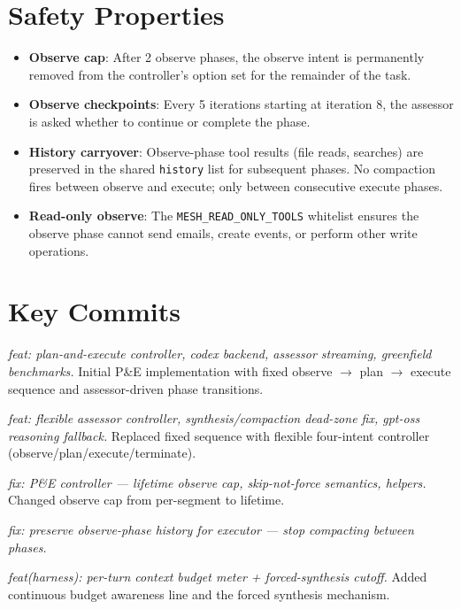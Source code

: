 \documentclass[11pt,letterpaper]{report}
\newcommand{\code}[1]{\texttt{#1}}
\begin{document}
\section{Safety Properties}

\begin{itemize}[nosep]
  \item \textbf{Observe cap}: After 2 observe phases, the observe
        intent is permanently removed from the controller's option set
        for the remainder of the task.
  \item \textbf{Observe checkpoints}: Every 5 iterations starting at
        iteration 8, the assessor is asked whether to continue or
        complete the phase.
  \item \textbf{History carryover}: Observe-phase tool results
        (file reads, searches) are preserved in the shared
        \code{history} list for subsequent phases. No compaction fires
        between observe and execute; only between consecutive execute
        phases.
  \item \textbf{Read-only observe}: The \code{MESH\_READ\_ONLY\_TOOLS}
        whitelist ensures the observe phase cannot send emails, create
        events, or perform other write operations.
\end{itemize}


\section{Key Commits}
\label{sec:commits}

\begin{description}[style=nextline,leftmargin=0pt]
  \item[\code{54a33f8a}]
    \textit{feat: plan-and-execute controller, codex backend, assessor
    streaming, greenfield benchmarks.}
    Initial P\&E implementation with fixed observe $\to$ plan $\to$
    execute sequence and assessor-driven phase transitions.

  \item[\code{c4bc1763}]
    \textit{feat: flexible assessor controller, synthesis/compaction
    dead-zone fix, gpt-oss reasoning fallback.}
    Replaced fixed sequence with flexible four-intent controller
    (observe/plan/execute/terminate).

  \item[\code{bb62ff3c}]
    \textit{fix: P\&E controller --- lifetime observe cap,
    skip-not-force semantics, helpers.}
    Changed observe cap from per-segment to lifetime.

  \item[\code{d8d74ca5}]
    \textit{fix: preserve observe-phase history for executor --- stop
    compacting between phases.}

  \item[\code{177d8689}]
    \textit{feat(harness): per-turn context budget meter + forced-synthesis cutoff.}
    Added continuous budget awareness line and the forced synthesis
    mechanism.
\end{description}
\end{document}
